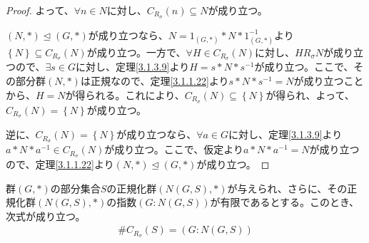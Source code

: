 \documentclass[dvipdfmx]{jsarticle}
\begin{document}
\begin{proof}
よって、$\forall n \in N$に対し、$C_{R_{\sigma}}(n) \subseteq N$が成り立つ。\par
$(N,*) \trianglelefteq (G,*)$が成り立つなら、$N = 1_{(G,*)}*N*1_{(G,*)}^{- 1}$より$\left\{ N \right\} \subseteq C_{R_{\sigma}}(N)$が成り立つ。一方で、$\forall H \in C_{R_{\sigma}}(N)$に対し、$HR_{\sigma}N$が成り立つので、$\exists s \in G$に対し、定理\ref{3.1.3.9}より$H = s*N*s^{- 1}$が成り立つ。ここで、その部分群$(N,*)$は正規なので、定理\ref{3.1.1.22}より$s*N*s^{- 1} = N$が成り立つことから、$H = N$が得られる。これにより、$C_{R_{\sigma}}(N) \subseteq \left\{ N \right\}$が得られ、よって、$C_{R_{\sigma}}(N) = \left\{ N \right\}$が成り立つ。\par
逆に、$C_{R_{\sigma}}(N) = \left\{ N \right\}$が成り立つなら、$\forall a \in G$に対し、定理\ref{3.1.3.9}より$a*N*a^{- 1} \in C_{R_{\sigma}}(N)$が成り立つ。ここで、仮定より$a*N*a^{- 1} = N$が成り立つので、定理\ref{3.1.1.22}より$(N,*) \trianglelefteq (G,*)$が成り立つ。
\end{proof}
\begin{thm}\label{3.1.3.13}
群$(G,*)$の部分集合$S$の正規化群$\left( N(G,S),* \right)$が与えられ、さらに、その正規化群$\left( N(G,S),* \right)$の指数$\left( G:N(G,S) \right)$が有限であるとする。このとき、次式が成り立つ。
\begin{align*}
\#{C_{R_{\sigma}}(S)} = \left( G:N(G,S) \right)
\end{align*}
\end{thm}
\end{document}
